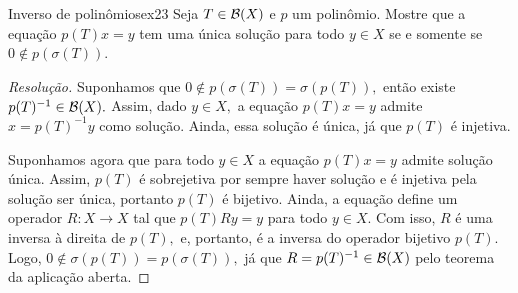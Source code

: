 \begin{exercício}{Inverso de polinômios}{ex23}
    Seja \(T \in \mathcal{B}(X)\) e \(p\) um polinômio. Mostre que a equação \(p(T)x = y\) tem uma única solução para todo \(y \in X\) se e somente se \(0 \notin p(\sigma(T)).\)
\end{exercício}
\begin{proof}[Resolução]
  Suponhamos que \(0 \notin p(\sigma(T)) = \sigma(p(T)),\) então existe \(p(T)^{-1} \in \mathcal{B}(X).\) Assim, dado \(y \in X,\) a equação \(p(T)x = y\) admite \(x = p(T)^{-1}y\) como solução. Ainda, essa solução é única, já que \(p(T)\) é injetiva.

  Suponhamos agora que para todo \(y \in X\) a equação \(p(T)x = y\) admite solução única. Assim, \(p(T)\) é sobrejetiva por sempre haver solução e é injetiva pela solução ser única, portanto \(p(T)\) é bijetivo. Ainda, a equação define um operador \(R : X \to X\) tal que \(p(T)Ry = y\) para todo \(y \in X.\) Com isso, \(R\) é uma inversa à direita de \(p(T),\) e, portanto, é a inversa do operador bijetivo \(p(T)\). Logo, \(0 \notin \sigma(p(T)) = p(\sigma(T)),\) já que \(R = p(T)^{-1} \in \mathcal{B}(X)\) pelo teorema da aplicação aberta.
\end{proof}

